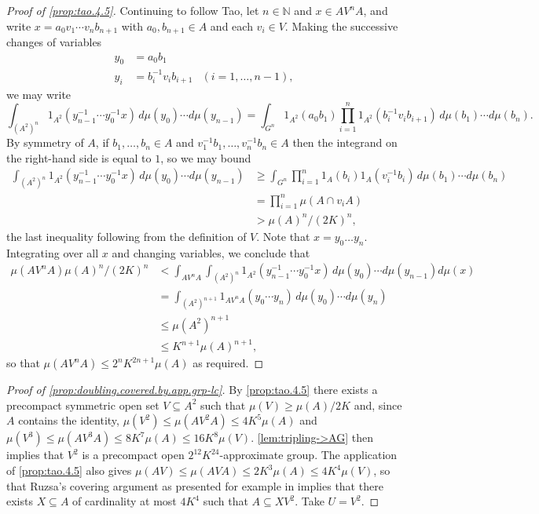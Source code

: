 \documentclass[10pt]{article}
\newcommand{\N}{\mathbb{N}}
\begin{document}
\begin{proof}[Proof of \cref{prop:tao.4.5}]
Continuing to follow Tao, let $n\in\N$ and $x\in AV^nA$, and write $x=a_0v_1\cdots v_nb_{n+1}$ with $a_0,b_{n+1}\in A$ and each $v_i\in V$. Making the successive changes of variables
\begin{align*}
y_0 &= a_0 b_1\\
y_i &= b_i^{-1} v_i b_{i+1}&(i=1,\ldots,n-1),
\end{align*}
we may write
\[
\int_{(A^2)^n}1_{A^2}(y_{n-1}^{-1}\cdots y_0^{-1}x)\,d\mu(y_0)\cdots d\mu(y_{n-1})=\int_{G^n}1_{A^2}(a_0b_1)\prod_{i=1}^n1_{A^2}(b_i^{-1} v_i b_{i+1})\,d\mu(b_1)\cdots d\mu(b_n).
\]
By symmetry of $A$, if $b_1,\ldots,b_n\in A$ and $v_1^{-1}b_1,\ldots,v_n^{-1}b_n\in A$ then the integrand on the right-hand side is equal to $1$, so we may bound
\begin{align*}
\int_{(A^2)^n}1_{A^2}(y_{n-1}^{-1}\cdots y_0^{-1}x)\,d\mu(y_0)\cdots d\mu(y_{n-1})&\ge\int_{G^n}\prod_{i=1}^n1_{A}(b_i)1_A(v_i^{-1}b_i)\,d\mu(b_1)\cdots d\mu(b_n)\\
	&=\prod_{i=1}^n\mu(A\cap v_iA)\\
	&>\mu(A)^n/(2K)^n,
\end{align*}
the last inequality following from the definition of $V$. Note that $x=y_0\ldots y_n$. Integrating over all $x$ and changing variables, we conclude that
\begin{align*}
\mu(AV^nA)\mu(A)^n/(2K)^n&<\int_{AV^nA}\int_{(A^2)^n}1_{A^2}(y_{n-1}^{-1}\cdots y_0^{-1}x)\,d\mu(y_0)\cdots d\mu(y_{n-1})d\mu(x)\\
			&=\int_{(A^2)^{n+1}}1_{AV^nA}(y_0\cdots y_n)\,d\mu(y_0)\cdots d\mu(y_n)\\
			&\le\mu(A^2)^{n+1}\\
			&\le K^{n+1}\mu(A)^{n+1},
\end{align*}
so that $\mu(AV^nA)\le2^nK^{2n+1}\mu(A)$ as required.
\end{proof}
\begin{proof}[Proof of \cref{prop:doubling.covered.by.app.grp-lc}]
By \cref{prop:tao.4.5} there exists a precompact symmetric open set $V\subseteq A^2$ such that $\mu(V)\ge\mu(A)/2K$ and, since $A$ contains the identity, $\mu(V^2)\le\mu(AV^2A)\le4K^5\mu(A)$ and $\mu(V^3)\le\mu(AV^3A)\le8K^7\mu(A)\le16K^8\mu(V)$. \cref{lem:tripling->AG} then implies that $V^2$ is a precompact open $2^{12}K^{24}$-approximate group. The application of \cref{prop:tao.4.5} also gives $\mu(AV)\le\mu(AVA)\le2K^3\mu(A)\le4K^4\mu(V)$, so that Ruzsa's covering argument \cite{ruzsa} as presented for example in \cite[Lemma 2.4.4]{book} implies that there exists $X\subseteq A$ of cardinality at most $4K^4$ such that $A\subseteq XV^2$. Take $U=V^2$.
\end{proof}
\end{document}
